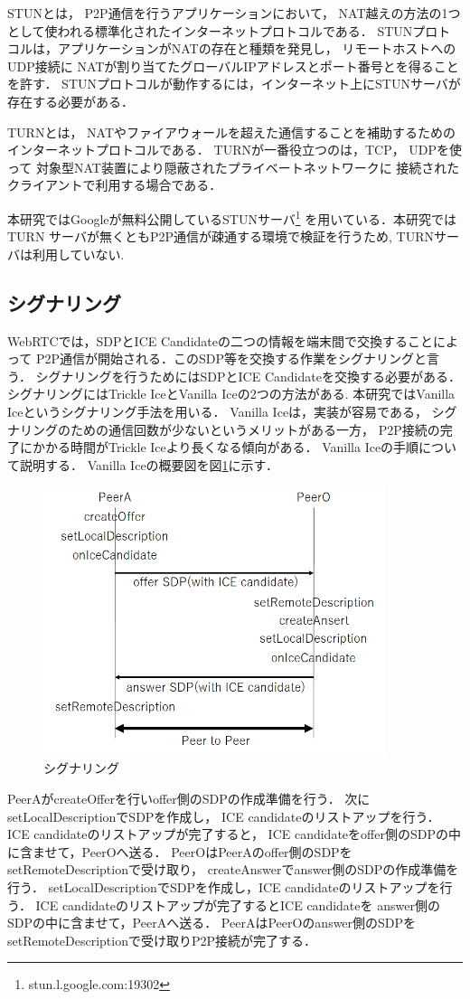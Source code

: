 \documentclass[sotsuron]{jcsie}
\begin{document}
STUN\cite{wing2008session}とは，
P2P通信を行うアプリケーションにおいて，
NAT越えの方法の1つとして使われる標準化されたインターネットプロトコルである．
STUNプロトコルは，アプリケーションがNATの存在と種類を発見し，
リモートホストへのUDP接続に
NATが割り当てたグローバルIPアドレスとポート番号とを得ることを許す．
STUNプロトコルが動作するには，インターネット上にSTUNサーバが存在する必要がある．

TURN\cite{matthews2010traversal}とは，
NATやファイアウォールを超えた通信することを補助するための
インターネットプロトコルである．
TURNが一番役立つのは，TCP， UDPを使って
対象型NAT装置により隠蔽されたプライベートネットワークに
接続されたクライアントで利用する場合である．

本研究ではGoogleが無料公開しているSTUNサーバ\footnote{stun.l.google.com:19302}
を用いている．本研究ではTURN
サーバが無くともP2P通信が疎通する環境で検証を行うため, 
TURNサーバは利用していない.

\subsection{シグナリング}
WebRTCでは，SDPとICE Candidateの二つの情報を端末間で交換することによって
P2P通信が開始される．このSDP等を交換する作業をシグナリングと言う．
シグナリングを行うためにはSDPとICE Candidateを交換する必要がある．
シグナリングにはTrickle IceとVanilla Iceの2つの方法がある.
本研究ではVanilla Iceというシグナリング手法を用いる．
Vanilla Iceは，実装が容易である，
シグナリングのための通信回数が少ないというメリットがある一方，
P2P接続の完了にかかる時間がTrickle Iceより長くなる傾向がある．
Vanilla Iceの手順について説明する．
Vanilla Iceの概要図を図\ref{fig:signaling}に示す．
\begin{figure}[H]
	\centering
	\includegraphics[width=10cm]{./assets/image/signaling.png}
	\caption{シグナリング}
	\label{fig:signaling}
\end{figure}
PeerAがcreateOfferを行いoffer側のSDPの作成準備を行う．
次にsetLocalDescriptionでSDPを作成し，
ICE candidateのリストアップを行う．
ICE candidateのリストアップが完了すると，
ICE candidateをoffer側のSDPの中に含ませて，PeerOへ送る．
PeerOはPeerAのoffer側のSDPをsetRemoteDescriptionで受け取り，
createAnswerでanswer側のSDPの作成準備を行う．
setLocalDescriptionでSDPを作成し，ICE candidateのリストアップを行う．
ICE candidateのリストアップが完了するとICE candidateを
answer側のSDPの中に含ませて，PeerAへ送る．
PeerAはPeerOのanswer側のSDPをsetRemoteDescriptionで受け取りP2P接続が完了する．
\end{document}
